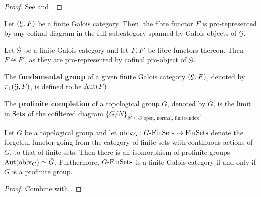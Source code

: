                 \begin{proof}
                    See \cite[\href{https://stacks.math.columbia.edu/tag/0BN0}{Tag 0BN0}]{stacks} and \cite[Proposition 3.5]{nlab:connected_objects}.
                \end{proof}
            \begin{proposition} \label{prop: fibre_functors_of_finite_galois_categories_are_pro_represented_by_galois_objects}
                \cite[\href{https://stacks.math.columbia.edu/tag/0BN3}{Tag 0BN3}]{stacks} Let $(\mathcal{G}, F)$ be a finite Galois category. Then, the fibre functor $F$ is pro-represented by any cofinal diagram in the full subcategory spanned by Galois objects of $\mathcal{G}$.
            \end{proposition}
            \begin{corollary} \label{coro: only_one_fibre_functor_on_a_finite_galois_category}
                Let $\mathcal{G}$ be a finite Galois category and let $F, F'$ be fibre functors thereon. Then $F \cong F'$, as they are pro-represented by cofinal pro-object of $\mathcal{G}$.
            \end{corollary}
            
            \begin{definition} \label{def: fundamental_groups_of_finite_galois_categories}
                The \textbf{fundamental group} of a given finite Galois category $(\mathcal{G}, F)$, denoted by $\pi_1(\mathcal{G}, F)$, is defined to be $\mathrm{Aut}(F)$.
            \end{definition}
            
            \begin{definition} \label{def: profinite_completions_of_groups}
                The \textbf{profinite completion} of a topological group $G$, denoted by $\hat{G}$, is the limit in $\mathrm{Sets}$ of the cofiltered diagram $\{G/N\}_{\text{$N \leq G$ open, normal, finite-index}}$. 
            \end{definition}
            \begin{proposition} \label{prop: finite_galois_categories_of_equivariant_finite_sets}
                Let $G$ be a topological group and let $\mathrm{oblv}_G: G\text{-}\mathrm{Fin}\mathrm{Sets} \to \mathrm{Fin}\mathrm{Sets}$ denote the forgetful functor going from the category of finite sets with continuous actions of $G$, to that of finite sets. Then there is an isomorphism of profinite groups $\mathrm{Aut}(\mathrm{oblv}_G) \simeq \hat{G}$. Furthermore, $G\text{-}\mathrm{Fin}\mathrm{Sets}$ is a finite Galois category if and only if $G$ is a profinite group. 
            \end{proposition}
                \begin{proof}
                    Combine \cite[IV.2.4 et IV.2.7]{sga4} with \cite[\href{https://stacks.math.columbia.edu/tag/0BMU}{Tag 0BMU}]{stacks}.
                \end{proof}
                
